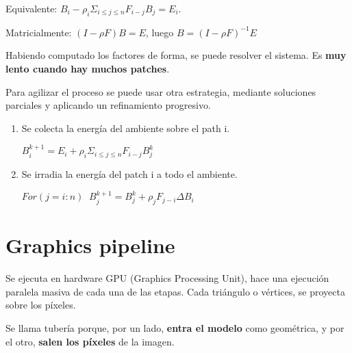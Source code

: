 Equivalente: $B_i - \rho_i \Sigma_{i \leq j \leq n} F_{i-j} B_j=E_i$.

Matricialmente: $(I - \rho F)B=E$, luego $B=(I-\rho F)^{-1} E$

Habiendo computado los factores de forma, se puede resolver el sistema. Es \textbf{muy lento cuando hay muchos patches}.

Para agilizar el proceso se puede usar otra estrategia, mediante soluciones parciales y aplicando un refinamiento progresivo. 
\begin{enumerate}
    \item Se colecta la energía del ambiente sobre el path i. 
    
    $B_i^{k+1} = E_i + \rho_i \Sigma_{i \leq j \leq n} F_{i-j} B_j^{k}$
    \item Se irradia la energía del patch i a todo el ambiente. 
    
    $For (j= i:n)\;\; B_j^{k+1} = B_j^{k} + \rho_j F_{j-i} \Delta B_i$
\end{enumerate}
\pagebreak

\section{Graphics pipeline}
Se ejecuta en hardware GPU (Graphics Processing Unit), hace una ejecución paralela masiva de cada una de las etapas. Cada triángulo o vértices, se proyecta sobre los píxeles.

Se llama tubería porque, por un lado, \textbf{entra el modelo} como geométrica, y por el otro, \textbf{salen los píxeles} de la imagen.

